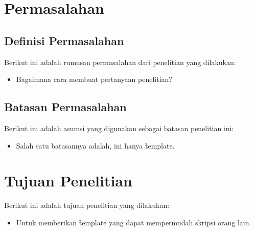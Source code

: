 \section{Permasalahan}

\subsection{Definisi Permasalahan}
Berikut ini adalah rumusan permasalahan dari penelitian yang dilakukan:
\begin{itemize}
	\item Bagaimana cara membuat pertanyaan penelitian?
\end{itemize}


\subsection{Batasan Permasalahan}
Berikut ini adalah asumsi yang digunakan sebagai batasan penelitian ini:
\begin{itemize}
	\item Salah satu batasannya adalah, ini hanya \f{template}.
\end{itemize}


\section{Tujuan Penelitian}
Berikut ini adalah tujuan penelitian yang dilakukan:
\begin{itemize}
	\item Untuk memberikan \f{template} yang dapat mempermudah skripsi orang
	lain.
\end{itemize}


